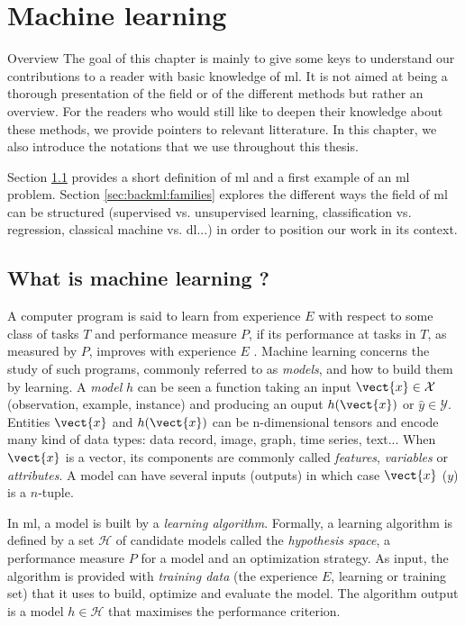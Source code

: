 \chapter{Machine learning}
\label{chap:backml}

\begin{overview}{Overview}
The goal of this chapter is mainly to give some keys to understand our contributions to a reader with basic knowledge of \acrlong{ml}. It is not aimed at being a thorough presentation of the field or of the different methods but rather an overview. For the readers who would still like to deepen their knowledge about these methods, we provide pointers to relevant litterature. In this chapter, we also introduce the notations that we use throughout this thesis. 

Section \ref{sec:backml:whatisml} provides a short definition of \acrlong{ml} and a first example of an \acrshort{ml} problem. Section \ref{sec:backml:families} explores the different ways the field of \acrlong{ml} can be structured (\eg supervised vs. unsupervised learning, classification vs. regression, classical machine vs. \acrlong{dl}...) in order to position our work in its context.   
\end{overview}

\section{What is machine learning ?} 
\label{sec:backml:whatisml}

A computer program is said to learn from experience $E$ with respect to some class of tasks $T$ and performance measure $P$, if its performance at tasks in $T$, as measured by $P$, improves with experience $E$ \parencite{mitchell1997machine}. Machine learning concerns the study of such programs, commonly referred to as \textit{models}, and how to build them by learning. A \textit{model} $h$ can be seen a function taking an input $\vect{x} \in \mathcal{X}$ (\aka observation, example, instance) and producing an ouput $h(\vect{x})$ or $\hat{y} \in \mathcal{Y}$. Entities $\vect{x}$ and $h(\vect{x})$ can be  n-dimensional tensors and encode many kind of data types: data record, image, graph, time series, text... When $\vect{x}$ is a vector, its components are commonly called \textit{features}, \textit{variables} or \textit{attributes}. A model can have several inputs (\resp outputs) in which case $\vect{x}$ (\resp $y$) is a $n$-tuple.

In \acrlong{ml}, a model is built by a \textit{learning algorithm}. Formally, a learning algorithm is defined by a set $\mathcal{H}$ of candidate models called the \textit{hypothesis space}, a performance measure $P$ for a model and an optimization strategy. As input, the algorithm is provided with \textit{training data} (the experience $E$, \aka learning or training set) that it uses to build, optimize and evaluate the model. The algorithm output is a model $h \in \mathcal{H}$ that maximises the performance criterion. 

